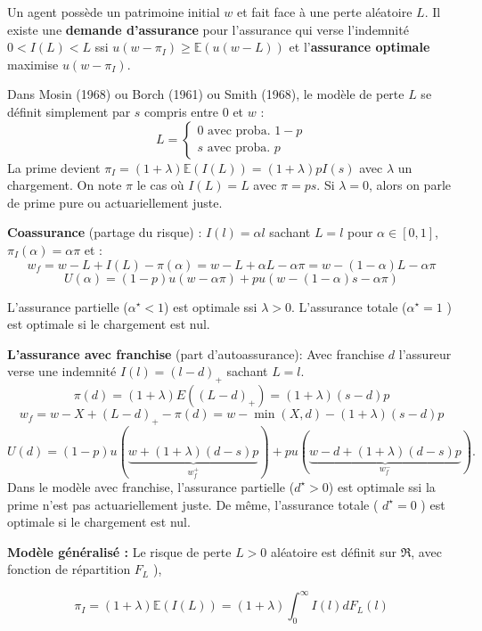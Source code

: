 \begin{f}
	
Un agent possède un patrimoine initial \(w\) et fait face à une perte aléatoire \(L\). Il existe une \textbf{demande d'assurance} pour l'assurance qui verse l'indemnité $0<I(L)<L$ ssi $u(w-\pi_I) \geq \mathbb{E}(u(w-L))$ et l'\textbf{assurance optimale} maximise $u(w-\pi_I)$.

Dans Mosin (1968) ou  Borch (1961) ou Smith (1968), le modèle de perte $L$ se définit simplement par  $s$ compris entre 0 et  \(w\) :
	$$
	L=\left\{\begin{array}{l}
		0 \text { avec proba. } 1-p \\
		s \text { avec proba. } p
	\end{array}\right.
	$$
La prime devient $\pi_I=(1+\lambda) \mathbb{E}(I(L))=(1+\lambda) p I(s)$ avec $\lambda$ un chargement. On note $\pi$ le cas où $I(L)=L$ avec  $\pi= p s$. Si $\lambda=0$, alors on parle de prime pure ou actuariellement juste. 
\medskip

\textbf{Coassurance} (partage du risque) :
 $I(l)=\alpha l$ sachant $L=l$ pour $\alpha \in[0,1]$, $\pi_I(\alpha)=\alpha \pi$ et :
$$
w_{f}=w-L+I(L)-\pi(\alpha)=w-L+\alpha L-\alpha \pi=w-(1-\alpha) L-\alpha \pi
$$
$$
U(\alpha)%
=(1-p) u(w-\alpha \pi)+p u(w-(1-\alpha) s-\alpha \pi)
$$

L'assurance partielle ($\alpha^{\star}<1$) est optimale ssi $\lambda>0$. L'assurance totale ($\alpha^{\star}=1$ ) est optimale si le chargement est nul.
\medskip

\textbf{L'assurance avec franchise} (part d'autoassurance):
Avec franchise $d$ l'assureur verse une indemnité $I(l)=(l-d)_{+}$ sachant $L=l$. 
$$
\pi(d)=(1+\lambda) E\left((L-d)_{+}\right)=(1+\lambda)(s-d) p
$$
$$
w_{f}=w-X+(L-d)_{+}-\pi(d)=w-\min (X, d)-(1+\lambda)(s-d) p
$$
$$
U(d)=(1-p) u(\underbrace{w+(1+\lambda)(d-s) p}_{w_{f}^{+}})+p u(\underbrace{w-d+(1+\lambda)(d-s) p}_{w_{f}^{-}}) .
$$
Dans le modèle avec franchise, l'assurance partielle ($d^{\star}>0$) est optimale ssi la prime n'est pas actuariellement juste. De même,  l'assurance totale ( $d^{\star}=0$ ) est optimale si le chargement est nul.
\medskip

\textbf{Modèle généralisé :}
Le risque de perte $L>0$ aléatoire est définit sur $\Re$, avec fonction de répartition $F_L$ ), 

$$
\pi_I=(1+\lambda) \mathbb{E}(I(L))=(1+\lambda) \int_{0}^{\infty} I(l) d F_{L}(l)
$$




\end{f}
